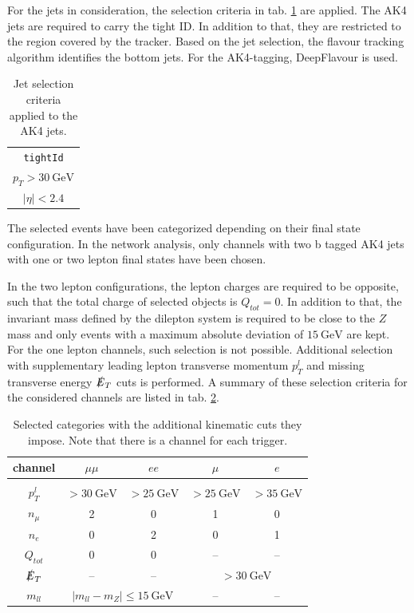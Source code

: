 For the jets in consideration, the selection criteria in tab. \ref{tab:jet_selection} are applied. The AK4 jets are required to carry the tight ID. In addition to that, they are restricted to the region covered by the tracker. Based on the jet selection, the flavour tracking algorithm identifies the bottom jets. For the AK4-tagging, DeepFlavour is used.

\begin{table}[h!]
	\centering
	\begin{tabular}{c}
		\hline
		\texttt{tightId} \\
		$p_T > \SI{30}{\giga\electronvolt}$ \\
		$|\eta| < 2.4$ \\
		\hline
	\end{tabular}
	\caption{Jet selection criteria applied to the AK4 jets.}
	\label{tab:jet_selection}
\end{table}


The selected events have been categorized depending on their final state configuration. In the network analysis, only channels with two b tagged AK4 jets with one or two lepton final states have been chosen.

In the two lepton configurations, the lepton charges are required to be opposite, such that the total charge of selected objects is $Q_{tot} = 0$. In addition to that, the invariant mass defined by the dilepton system is required to be close to the $Z$ mass and only events with a maximum absolute deviation of $\SI{15}{\giga\electronvolt}$ are kept. For the one lepton channels, such selection is not possible. Additional selection with supplementary leading lepton transverse momentum $p^l_T$ and missing transverse energy $\slashed{E}_T$ cuts is performed. A summary of these selection criteria for the considered channels are listed in tab. \ref{tab:categories}.


\begin{table}[h!]
	\centering
	\begin{tabular}{ccccc}
		channel & $\mu\mu$ & $ee$ & $\mu$ & $e$ \\
		\hline \hline \\
		$p^l_T$ & $>\SI{30}{\giga\electronvolt}$ & $>\SI{25}{\giga\electronvolt}$ & $>\SI{25}{\giga\electronvolt}$ & $>\SI{35}{\giga\electronvolt}$ \\
		$n_\mu$ & 2 & 0 & 1 & 0 \\
		$n_e$ & 0 & 2 & 0 & 1 \\
		$Q_{tot}$ & 0 & 0 & -- & -- \\
		$\slashed{E}_T$ & -- & -- & \multicolumn{2}{c}{$>\SI{30}{\giga\electronvolt}$}  \\
		$m_{ll}$ & \multicolumn{2}{c}{$|m_{ll}-m_Z|\leq\SI{15}{\giga\electronvolt}$} & -- & -- \\
	\end{tabular}
	\caption{Selected categories with the additional kinematic cuts they impose. Note that there is a channel for each trigger.}
	\label{tab:categories}
\end{table}


